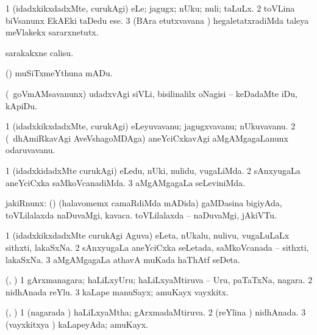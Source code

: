 \bentry
{}
\gl{\sakirx}
\bmng
\bnum
\num{1} (idadxkikxdadxMte, curukAgi) eLe; jagugx; nUku; nuli; taLuLx. 
\num{2} toVLina biVsanunx EkAEki taDedu ese. 
\num{3} (BAra etutxvavana \vi) hegaletatxradiMda taleya meVlakekx sararxnetutx. 
\enum
\emng

\noindent
\gl{\akirx}
\bmng
sarakakxne calisu. 
\emng

\noindent
\gl{\pagu}
\bmng
{} (\ashi) muSiTxmeYthuna mADu. 
\emng
\eentry

\bentry
{}
\gl{\sakirx}
\bmng
(\kanmu\ goVmAMsavanunx) udadxvAgi siVLi, bisilinalilx oNagisi -- keDadaMte iDu, kApiDu. 
\emng
\eentry

\bentry
{}
\gl{\nA}
\bmng
\bnum
\num{1} (idadxkikxdadxMte, curukAgi) eLeyuvavanu; jagugxvavanu; nUkuvavanu. 
\num{2} (\kanmu\ dhAmiRkavAgi AveVshagoMDAga) aneYciCxkavAgi aMgAMgagaLanunx odaruvavanu. 
\enum
\emng
\eentry

\bentry
{}
\gl{\kirxvi}
\bmng
\bnum
\num{1} (idadxkidadxMte curukAgi) eLedu, nUki, nulidu, \mo vugaLiMda. 
\num{2} sAnxyugaLa aneYciCxka saMkoVcanadiMda. 
\num{3} aMgAMgagaLa seLeviniMda. 
\enum
\emng
\eentry

\bentry
{}
\gl{\nA}
\bmng
jakiRnunx: 
\banum
{} (\ca) (halavomemx camaRdiMda mADida) gaMDasina bigiyAda, toVLilalaxda naDuvaMgi, kavaca.  
 toVLilalaxda -- naDuvaMgi, jAkiVTu. 
\eanum
\emng
\eentry

\bentry
{}
\gl{\nA}
\bmng
\bnum
\num{1} (idadxkikxdadxMte curukAgi Aguva) eLeta, nUkalu, nulivu, \mo vugaLuLaLx sithxti, lakaSxNa. 
\num{2} sAnxyugaLa aneYciCxka seLetada, saMkoVcanada -- sithxti, lakaSxNa. 
\num{3} aMgAMgagaLa athavA muKada haThAtf seDeta. 
\enum
\emng
\eentry

\bentry
{}
\gl{\nA}
\bmng
(\ame, \AmA) 
\bnum
\num{1} gArxmanagara; haLiLxyUru; haLiLxyaMtiruva -- Uru, paTaTxNa, nagara. 
\num{2} nidhAnada reYlu. 
\num{3} kaLape manuSayx; amuKayx vayxkitx. 
\enum
\emng
\eentry

\bentry
{}
\gl{\gu}
\bmng
(\ame, \AmA) 
\bnum
\num{1} (nagarada \vi) haLiLxyaMtha; gArxmadaMtiruva. 
\num{2} (reYlina \vi) nidhAnada. 
\num{3} (vayxkitxya \vi) kaLapeyAda; amuKayx. 
\enum
\emng
\eentry

